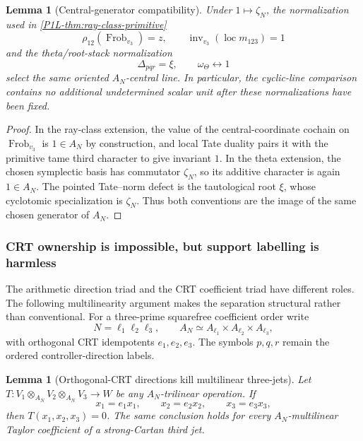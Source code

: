 \documentclass[11pt]{article}
\newtheorem{lemma}[theorem]{Lemma}
\theoremstyle{remark}
\providecommand{\loc}{\operatorname{loc}}
\providecommand{\inv}{\operatorname{inv}}
\begin{document}
\begin{lemma}[Central-generator compatibility]\label{P1L-prop:center-compatibility}
Under $1\mapsto\zeta_N$, the normalization used in \cref{P1L-thm:ray-class-primitive}
\[
 \rho_{12}(\operatorname{Frob}_{v_3})=z,
 \qquad
 \inv_{v_3}(\loc m_{123})=1
\]
and the theta/root-stack normalization
\[
 \Delta_{pqr}=\xi,
 \qquad
 \omega_\Theta\longleftrightarrow1
\]
select the same oriented $A_N$-central line.  In particular, the cyclic-line comparison contains no additional undetermined scalar unit after these normalizations have been fixed.
\end{lemma}

\begin{proof}
In the ray-class extension, the value of the central-coordinate cochain on $\operatorname{Frob}_{v_3}$ is $1\in A_N$ by construction, and local Tate duality pairs it with the primitive tame third character to give invariant $1$.  In the theta extension, the chosen symplectic basis has commutator $\zeta_N$, so its additive character is again $1\in A_N$.  The pointed Tate--norm defect is the tautological root $\xi$, whose cyclotomic specialization is $\zeta_N$.  Thus both conventions are the image of the same chosen generator of $A_N$.
\end{proof}


\subsubsection{CRT ownership is impossible, but support labelling is harmless}

The arithmetic direction triad and the CRT coefficient triad have different
roles.  The following multilinearity argument makes the separation
structural rather than conventional.  For a three-prime squarefree
coefficient order write
\[
 N=\ell_1\ell_2\ell_3,\qquad
 A_N\simeq A_{\ell_1}\times A_{\ell_2}\times A_{\ell_3},
\]
with orthogonal CRT idempotents \(e_1,e_2,e_3\).  The symbols \(p,q,r\)
remain the ordered controller-direction labels.

\begin{lemma}[Orthogonal-CRT directions kill multilinear three-jets]\label{P1L-lem:crt-diagonal-no-go}
Let $T:V_1\otimes_{A_N}V_2\otimes_{A_N}V_3\to W$ be any $A_N$-trilinear operation.  If
\[
 x_1=e_1x_1,\qquad x_2=e_2x_2,\qquad x_3=e_3x_3,
\]
then $T(x_1,x_2,x_3)=0$.  The same conclusion holds for every $A_N$-multilinear Taylor coefficient of a strong-Cartan third jet.
\end{lemma}
\end{document}

